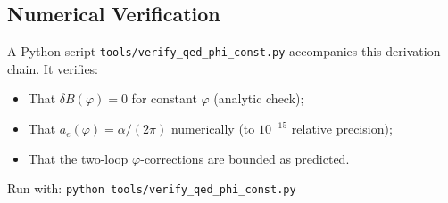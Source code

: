 \documentclass[12pt]{article}
\begin{document}
\subsection{Numerical Verification}

A Python script \texttt{tools/verify\_qed\_phi\_const.py} accompanies this derivation
chain.  It verifies:
\begin{itemize}
  \item That $\delta B(\varphi) = 0$ for constant $\varphi$ (analytic check);
  \item That $a_e(\varphi) = \alpha/(2\pi)$ numerically (to $10^{-15}$ relative precision);
  \item That the two-loop $\varphi$-corrections are bounded as predicted.
\end{itemize}

Run with: \texttt{python tools/verify\_qed\_phi\_const.py}

\ifdefined\INCLUDEMODE\else
  
\end{document}
